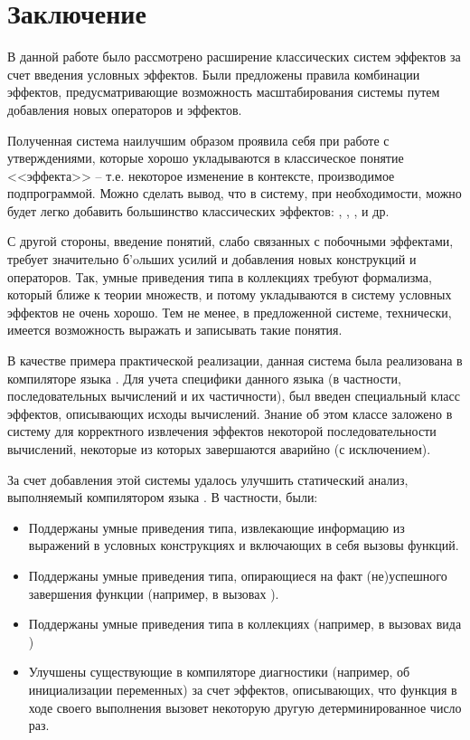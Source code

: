 \section*{Заключение}

В данной работе было рассмотрено расширение классических систем эффектов за счет введения условных эффектов. Были предложены правила комбинации эффектов, предусматривающие возможность масштабирования системы путем добавления новых операторов и эффектов.

Полученная система наилучшим образом проявила себя при работе с утверждениями, которые хорошо укладываются в классическое понятие <<эффекта>> -- т.е. некоторое изменение в контексте, производимое подпрограммой. Можно сделать вывод, что в систему, при необходимости, можно будет легко добавить большинство классических эффектов: , , , и др.

С другой стороны, введение понятий, слабо связанных с побочными эффектами, требует значительно б\a'{o}льших усилий и добавления новых конструкций и операторов. Так, умные приведения типа в коллекциях требуют формализма, который ближе к теории множеств, и потому укладываются в систему условных эффектов не очень хорошо. Тем не менее, в предложенной системе, технически, имеется возможность выражать и записывать такие понятия.

В качестве примера практической реализации, данная система была реализована в компиляторе языка . Для учета специфики данного языка (в частности, последовательных вычислений и их частичности), был введен специальный класс эффектов, описывающих исходы вычислений. Знание об этом классе заложено в систему для корректного извлечения эффектов некоторой последовательности вычислений, некоторые из которых завершаются аварийно (с исключением).

За счет добавления этой системы удалось улучшить статический анализ, выполняемый компилятором языка . В частности, были:

\begin{itemize}
  \item Поддержаны умные приведения типа, извлекающие информацию из выражений в условных конструкциях и включающих в себя вызовы функций.

  \item Поддержаны умные приведения типа, опирающиеся на факт (не)успешного завершения функции (например, в вызовах  ).

  \item Поддержаны умные приведения типа в коллекциях (например, в вызовах вида )

  \item Улучшены существующие в компиляторе диагностики (например, об инициализации переменных) за счет эффектов, описывающих, что функция в ходе своего выполнения вызовет некоторую другую детерминированное число раз.
\end{itemize}

